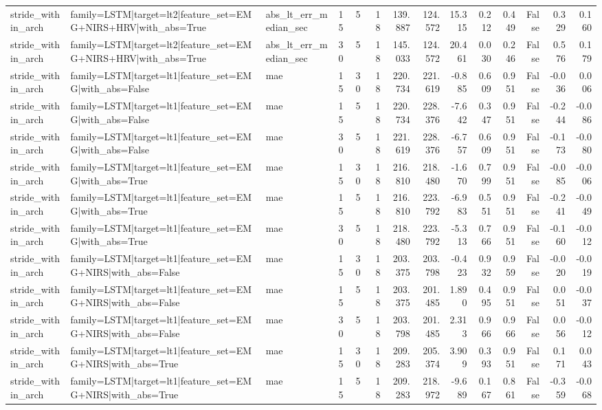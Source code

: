 \begin{table}
\begin{tabular}{lllllrrrrrrrrr}
stride_within_arch & family=LSTM|target=lt2|feature_set=EMG+NIRS+HRV|with_abs=True & abs_lt_err_median_sec & 15 & 5 & 18 & 139.887 & 124.572 & 15.315 & 0.212 & 0.449 & False & 0.329 & 0.160 \\
stride_within_arch & family=LSTM|target=lt2|feature_set=EMG+NIRS+HRV|with_abs=True & abs_lt_err_median_sec & 30 & 5 & 18 & 145.033 & 124.572 & 20.461 & 0.030 & 0.246 & False & 0.576 & 0.179 \\
stride_within_arch & family=LSTM|target=lt1|feature_set=EMG|with_abs=False & mae & 15 & 30 & 18 & 220.734 & 221.619 & -0.885 & 0.609 & 0.951 & False & -0.036 & 0.006 \\
stride_within_arch & family=LSTM|target=lt1|feature_set=EMG|with_abs=False & mae & 15 & 5 & 18 & 220.734 & 228.376 & -7.642 & 0.347 & 0.951 & False & -0.244 & -0.086 \\
stride_within_arch & family=LSTM|target=lt1|feature_set=EMG|with_abs=False & mae & 30 & 5 & 18 & 221.619 & 228.376 & -6.757 & 0.609 & 0.951 & False & -0.173 & -0.080 \\
stride_within_arch & family=LSTM|target=lt1|feature_set=EMG|with_abs=True & mae & 15 & 30 & 18 & 216.810 & 218.480 & -1.670 & 0.799 & 0.951 & False & -0.085 & -0.006 \\
stride_within_arch & family=LSTM|target=lt1|feature_set=EMG|with_abs=True & mae & 15 & 5 & 18 & 216.810 & 223.792 & -6.983 & 0.551 & 0.951 & False & -0.241 & -0.049 \\
stride_within_arch & family=LSTM|target=lt1|feature_set=EMG|with_abs=True & mae & 30 & 5 & 18 & 218.480 & 223.792 & -5.313 & 0.766 & 0.951 & False & -0.160 & -0.012 \\
stride_within_arch & family=LSTM|target=lt1|feature_set=EMG+NIRS|with_abs=False & mae & 15 & 30 & 18 & 203.375 & 203.798 & -0.423 & 0.932 & 0.959 & False & -0.020 & -0.019 \\
stride_within_arch & family=LSTM|target=lt1|feature_set=EMG+NIRS|with_abs=False & mae & 15 & 5 & 18 & 203.375 & 201.485 & 1.890 & 0.495 & 0.951 & False & 0.051 & -0.037 \\
stride_within_arch & family=LSTM|target=lt1|feature_set=EMG+NIRS|with_abs=False & mae & 30 & 5 & 18 & 203.798 & 201.485 & 2.313 & 0.966 & 0.966 & False & 0.056 & -0.012 \\
stride_within_arch & family=LSTM|target=lt1|feature_set=EMG+NIRS|with_abs=True & mae & 15 & 30 & 18 & 209.283 & 205.374 & 3.909 & 0.393 & 0.951 & False & 0.171 & 0.043 \\
stride_within_arch & family=LSTM|target=lt1|feature_set=EMG+NIRS|with_abs=True & mae & 15 & 5 & 18 & 209.283 & 218.972 & -9.689 & 0.167 & 0.861 & False & -0.359 & -0.068 \\

\end{tabular}
\end{table}
